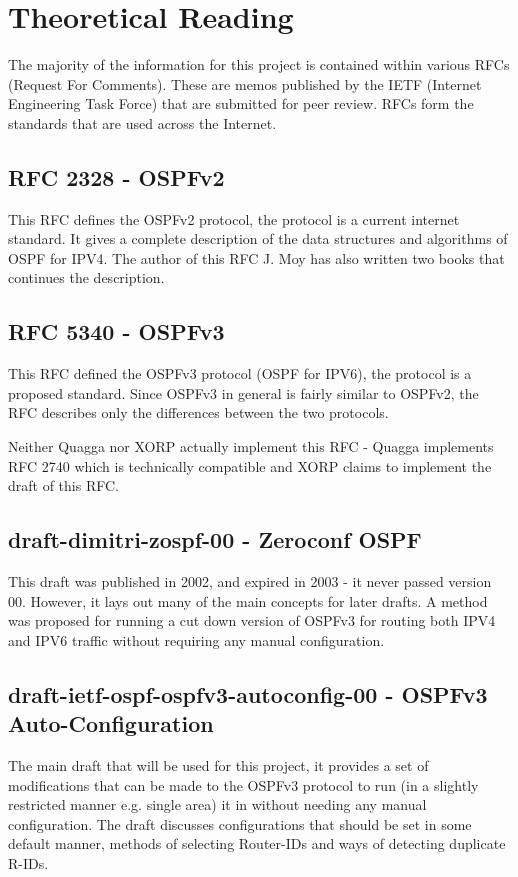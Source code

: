 \documentclass[12pt]{report}
\begin{document}
\section{Theoretical Reading}
The majority of the information for this project is contained within various
RFCs (Request For Comments).  These are memos published by the IETF (Internet
Engineering Task Force) that are submitted for peer review.  RFCs form the
standards that are used across the Internet.

\subsection{RFC 2328 - OSPFv2} 
This RFC defines the OSPFv2 protocol, the protocol is a current internet
standard. It gives a complete description of the data structures and algorithms
of OSPF for IPV4. The author of this RFC J. Moy has also written two books that
continues the description. 

\subsection{RFC 5340 - OSPFv3}
This RFC defined the OSPFv3 protocol (OSPF for IPV6), the protocol is a
proposed standard.  Since OSPFv3 in general is fairly similar to OSPFv2,
the RFC describes only the differences between the two protocols. 

Neither Quagga nor XORP actually implement this RFC - Quagga implements
RFC 2740 which is technically compatible and XORP claims to implement
the draft of this RFC. 

\subsection{draft-dimitri-zospf-00 - Zeroconf OSPF}
This draft was published in 2002, and expired in 2003 - it never passed
version 00.  However, it lays out many of the main concepts for later
drafts.  A method was proposed for running a cut down version of OSPFv3
for routing both IPV4 and IPV6 traffic without requiring any manual
	configuration. 

\subsection{draft-ietf-ospf-ospfv3-autoconfig-00 - OSPFv3 Auto-Configuration} 
The main draft that will be used for this project, it provides a set of
modifications that can be made to the OSPFv3 protocol to run (in a
slightly restricted manner e.g.  single area) it in without needing any
manual configuration.  The draft discusses configurations that should be
set in some default manner, methods of selecting Router-IDs and ways of
detecting duplicate R-IDs. 
\end{document}
